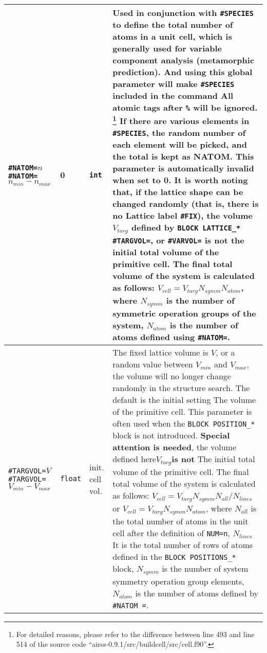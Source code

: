 \documentclass[a4paper, 10pt]{article}
\begin{document}
\begin{center}
\begin{longtable}{m{11em}|m{4em}<{\centering}|m{3em}<{\centering}|m{15em}}
\midrule
\verb|#NATOM=|\(n\) \hspace{6em}\verb|#NATOM=|\(n_{min}-n_{max}\)  & 0 & \verb|int| & Used in conjunction with \verb|#SPECIES| to define the total number of atoms in a unit cell, which is generally used for variable component analysis (metamorphic prediction). And using this global parameter will make \verb|#SPECIES| included in the command All atomic tags after \verb|%| will be ignored. \footnote{For detailed reasons, please refer to the difference between line 493 and line 514 of the source code ``airss-0.9.1/src/buildcell/src/cell.f90''.} If there are various elements in \verb|#SPECIES|, the random number of each element will be picked, and the total is kept as NATOM. This parameter is automatically invalid when set to 0. \textbf{It is worth noting that}, if the lattice shape can be changed randomly (that is, there is no Lattice label \verb|#FIX|), the volume \(V_{targ}\) defined by \verb|BLOCK LATTICE_*| \verb|#TARGVOL=|, or \verb|#VARVOL=| \textbf{is not}  the initial total volume of the primitive cell. The final total volume of the system is calculated as follows: \(V_{cell} = V_{targ} N_ {symm} N_{atom} \), where \(N_{symm}\) is the number of symmetric operation groups of the system, \(N_{atom}\) is the number of atoms defined using \verb|#NATOM=|.\\
\midrule
\verb|#TARGVOL=|\(V\) \verb|#TARGVOL=|\(V_{min}-V_{max}\) & \verb|float| & init. cell vol. & The fixed lattice volume is \(V\), or a random value between \(V_{min}\) and \(V_{max}\), the volume will no longer change randomly in the structure search. The default is the initial setting The volume of the primitive cell. This parameter is often used when the \verb|BLOCK POSITION_*| block is not introduced. \textbf{Special attention is needed}, the volume defined here\(V_{targ}\)\textbf{is not }The initial total volume of the primitive cell. The final total volume of the system is calculated as follows: \(V_{cell} = V_{targ} N_{symm} N_{all} / N_{lines}\) or \(V_{cell} = V_{targ} N_{symm} N_{atom} \), where \(N_{all}\) is the total number of atoms in the unit cell after the definition of \verb|NUM=n|, \(N_{lines}\) It is the total number of rows of atoms defined in the \verb|BLOCK POSITIONS_*| block, \(N_{symm}\) is the number of system symmetry operation group elements, \(N_{atom}\) is the number of atoms defined by \verb|#NATOM =|.\\
\midrule

\end{longtable}
\end{center}
\end{document}
